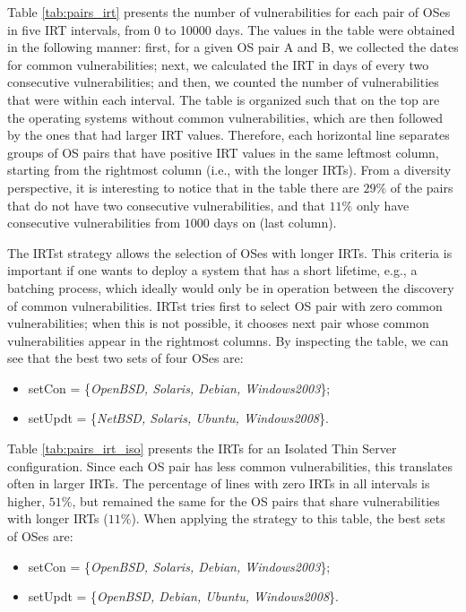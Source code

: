 Table \ref{tab:pairs_irt} presents the number of vulnerabilities for each pair of OSes in five IRT intervals, from 0 to 10000 days.
The values in the table were obtained in the following manner: first, for a given OS pair A and B, we collected the dates for common vulnerabilities; next, we calculated the IRT in days of every two consecutive vulnerabilities; and then, we counted the number of vulnerabilities that were within each interval.
The table is organized such that on the top are the operating systems without common vulnerabilities, which are then followed by the ones that had larger IRT values. Therefore, each horizontal line separates groups of OS pairs that have positive IRT values in the same leftmost column, starting from the rightmost column (i.e., with the longer IRTs). From a diversity perspective, it is interesting to notice that in the table there are $29\%$ of the pairs that do not have two consecutive vulnerabilities, and that $11\%$ only have consecutive vulnerabilities from $1000$ days on (last column).

The IRTst strategy allows the selection of OSes with longer IRTs. This criteria is important if one wants to deploy a system that has a short lifetime, e.g., a batching process, which ideally would only be in operation between the discovery of common vulnerabilities. IRTst tries first to select OS pair with zero common vulnerabilities; when this is not possible, it chooses next pair whose common vulnerabilities appear in the rightmost columns. By inspecting the table, we can see that the best two sets of four OSes are:

\begin{itemize}
\item setCon = \{\emph{OpenBSD, Solaris, Debian, Windows2003}\};
\item setUpdt = \{\emph{NetBSD, Solaris, Ubuntu, Windows2008}\}.
\end{itemize}


Table \ref{tab:pairs_irt_iso} presents the IRTs for an Isolated Thin Server configuration. Since each OS pair has less common vulnerabilities, this translates often in larger IRTs.  The percentage of lines with zero IRTs in all intervals is higher, $51\%$, but remained the same for the OS pairs that share vulnerabilities with longer IRTs ($11\%$). When applying the strategy to this table, the best sets of OSes are: 

\begin{itemize}
\item setCon = \{\emph{OpenBSD, Solaris, Debian, Windows2003}\};
\item setUpdt = \{\emph{OpenBSD, Debian, Ubuntu, Windows2008}\}.
\end{itemize}


